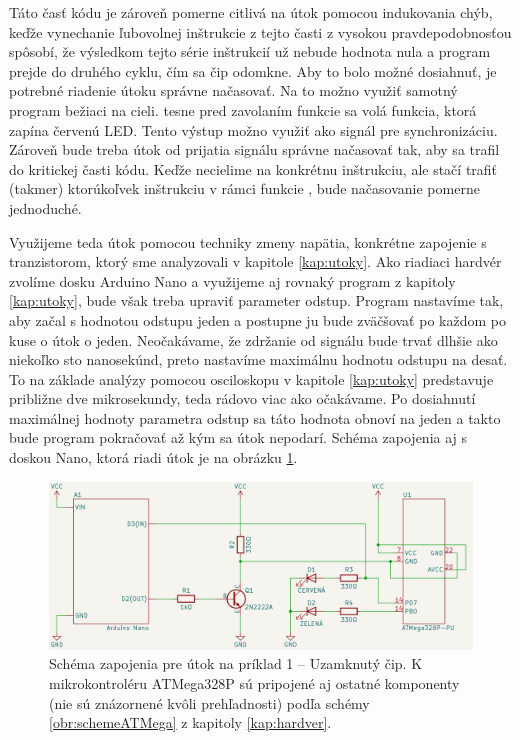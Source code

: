 Táto časť kódu je zároveň pomerne citlivá na útok pomocou indukovania chýb, keďže vynechanie ľubovolnej inštrukcie z tejto časti z vysokou pravdepodobnosťou spôsobí, že výsledkom tejto série inštrukcií už nebude hodnota nula a program prejde do druhého cyklu, čím sa čip odomkne. Aby to bolo možné dosiahnuť, je potrebné riadenie útoku správne načasovať. Na to možno využiť samotný program bežiaci na cieli. tesne pred zavolaním funkcie  sa volá funkcia, ktorá zapína červenú LED. Tento výstup možno využiť ako signál pre synchronizáciu. Zároveň bude treba útok od prijatia signálu správne načasovať tak, aby sa trafil do kritickej časti kódu. Keďže necielime na konkrétnu inštrukciu, ale stačí trafiť (takmer) ktorúkoľvek inštrukciu v rámci funkcie , bude načasovanie pomerne jednoduché.

Využijeme teda útok pomocou techniky zmeny napätia, konkrétne zapojenie s tranzistorom, ktorý sme analyzovali v kapitole \ref{kap:utoky}. Ako riadiaci hardvér zvolíme dosku Arduino Nano a využijeme aj rovnaký program z kapitoly \ref{kap:utoky}, bude však treba upraviť parameter odstup. Program nastavíme tak, aby začal s hodnotou odstupu jeden a postupne ju bude zväčšovať po každom po kuse o útok o jeden. Neočakávame, že zdržanie od signálu bude trvať dlhšie ako niekoľko sto nanosekúnd, preto nastavíme maximálnu hodnotu odstupu na desať. To na základe analýzy pomocou osciloskopu v kapitole \ref{kap:utoky} predstavuje približne dve mikrosekundy, teda rádovo viac ako očakávame. Po dosiahnutí maximálnej hodnoty parametra odstup sa táto hodnota obnoví na jeden a takto bude program pokračovať až kým sa útok nepodarí. Schéma zapojenia aj s doskou Nano, ktorá riadi útok je na obrázku \ref{obr:schemeCTF-LED}.

\begin{figure}
    \centerline{\includegraphics[width=1\textwidth]{images/schemeCTF-LED.png}}
    \caption[Schéma zapojenia pre útok na príklad 1]{Schéma zapojenia pre útok na príklad 1 -- Uzamknutý čip. K mikrokontroléru ATMega328P sú pripojené aj ostatné komponenty (nie sú znázornené kvôli prehľadnosti) podľa schémy \ref{obr:schemeATMega} z kapitoly \ref{kap:hardver}.}
    \label{obr:schemeCTF-LED}
\end{figure}

